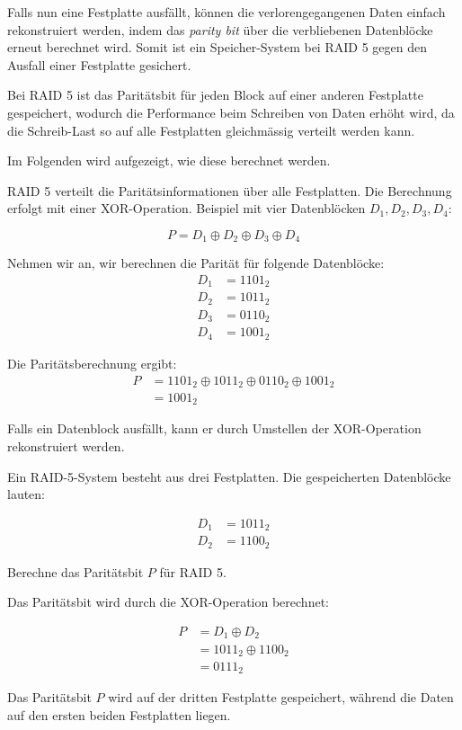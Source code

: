 Falls nun eine Festplatte ausfällt, können die verlorengegangenen Daten einfach rekonstruiert werden, indem das \textit{parity bit} über die verbliebenen Datenblöcke erneut berechnet wird. Somit ist ein Speicher-System bei RAID 5 gegen den Ausfall einer Festplatte gesichert.

Bei RAID 5 ist das Paritätsbit für jeden Block auf einer anderen Festplatte gespeichert, wodurch die Performance beim Schreiben von Daten erhöht wird, da die Schreib-Last so auf alle Festplatten gleichmässig verteilt werden kann.

Im Folgenden wird aufgezeigt, wie diese berechnet werden.

RAID 5 verteilt die Paritätsinformationen über alle Festplatten. Die Berechnung erfolgt mit einer XOR-Operation. Beispiel mit vier Datenblöcken $D_1, D_2, D_3, D_4$:

\begin{equation}
    P = D_1 \oplus D_2 \oplus D_3 \oplus D_4
\end{equation}

\begin{myexample}
Nehmen wir an, wir berechnen die Parität für folgende Datenblöcke:
\begin{align*}
    D_1 & = 1101_2 \\
    D_2 & = 1011_2 \\
    D_3 & = 0110_2 \\
    D_4 & = 1001_2
\end{align*}

Die Paritätsberechnung ergibt:
\begin{align*}
    P & = 1101_2 \oplus 1011_2 \oplus 0110_2 \oplus 1001_2 \\
      & = 1001_2
\end{align*}
\end{myexample}

Falls ein Datenblock ausfällt, kann er durch Umstellen der XOR-Operation rekonstruiert werden.

\begin{myexercise}
    Ein RAID-5-System besteht aus drei Festplatten. Die gespeicherten Datenblöcke lauten:

    \begin{align*}
        D_1 & = 1011_2 \\
        D_2 & = 1100_2
    \end{align*}

    Berechne das Paritätsbit $P$ für RAID 5.

    \begin{myanswer}
        Das Paritätsbit wird durch die XOR-Operation berechnet:

        \begin{align*}
            P & = D_1 \oplus D_2       \\
              & = 1011_2 \oplus 1100_2 \\
              & = 0111_2
        \end{align*}

        Das Paritätsbit $P$ wird auf der dritten Festplatte gespeichert, während die Daten auf den ersten beiden Festplatten liegen.
    \end{myanswer}
\end{myexercise}

